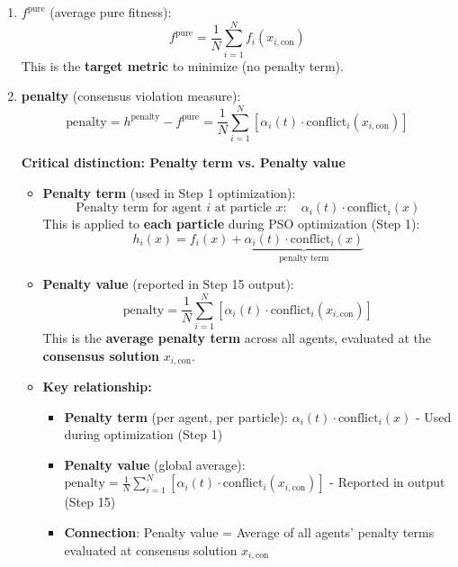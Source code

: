 \documentclass[11pt,a4paper]{article}
\begin{document}
\begin{itemize}
\begin{enumerate}
    \item \textbf{$f^{\text{pure}}$} (average pure fitness):
    \begin{equation}
    f^{\text{pure}} = \frac{1}{N}\sum_{i=1}^N f_i(x_{i,\text{con}})
    \end{equation}
    This is the \textbf{target metric} to minimize (no penalty term).
    
    \item \textbf{penalty} (consensus violation measure):
    \begin{equation}
    \text{penalty} = h^{\text{penalty}} - f^{\text{pure}} = \frac{1}{N}\sum_{i=1}^N \left[\alpha_i(t) \cdot \text{conflict}_i(x_{i,\text{con}})\right]
    \end{equation}
    
    \textbf{Critical distinction: Penalty term vs. Penalty value}
    
    \begin{itemize}
        \item \textbf{Penalty term} (used in Step 1 optimization):
        \begin{equation}
        \text{Penalty term for agent } i \text{ at particle } x: \quad \alpha_i(t) \cdot \text{conflict}_i(x)
        \end{equation}
        This is applied to \textbf{each particle} during PSO optimization (Step 1):
        \begin{equation}
        h_i(x) = f_i(x) + \underbrace{\alpha_i(t) \cdot \text{conflict}_i(x)}_{\text{penalty term}}
        \end{equation}
        
        \item \textbf{Penalty value} (reported in Step 15 output):
        \begin{equation}
        \text{penalty} = \frac{1}{N}\sum_{i=1}^N \left[\alpha_i(t) \cdot \text{conflict}_i(x_{i,\text{con}})\right]
        \end{equation}
        This is the \textbf{average penalty term} across all agents, evaluated at the \textbf{consensus solution} $x_{i,\text{con}}$.
        
        \item \textbf{Key relationship:}
        \begin{itemize}
            \item \textbf{Penalty term} (per agent, per particle): $\alpha_i(t) \cdot \text{conflict}_i(x)$ - Used during optimization (Step 1)
            \item \textbf{Penalty value} (global average): $\text{penalty} = \frac{1}{N}\sum_{i=1}^N [\alpha_i(t) \cdot \text{conflict}_i(x_{i,\text{con}})]$ - Reported in output (Step 15)
            \item \textbf{Connection}: Penalty value = Average of all agents' penalty terms evaluated at consensus solution $x_{i,\text{con}}$
        \end{itemize}
        

\end{itemize}
\end{enumerate}
\end{itemize}
\end{document}
